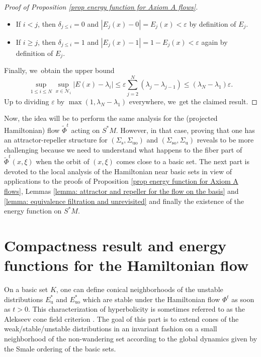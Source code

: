 \documentclass[JEP,XML,SOM,Unicode,NoEqCountersInSection,NoFloatCountersInSection,published]{cedram}
\newcommand{\rs}{\mathrm{s}}
\newcommand{\rso}{\mathrm{so}}
\newcommand{\ru}{\mathrm{u}}
\newcommand{\ruo}{\mathrm{uo}}
\theoremstyle{definition}
\theoremstyle{plain}
\newcommand{\Ncal}{\mathcal{N}}
\begin{document}
\begin{proof}[Proof of Proposition \ref{prop energy function for Axiom A flows}]
\begin{itemize}
\item If $i < j$, then $\delta_{j \leq i} = 0$ and $|E_j (x) - 0| = E_j (x) < \varepsilon$ by definition of $E_j$.
\item If $i \geq j$, then $\delta_{j \leq i} = 1$ and $|E_j (x) - 1| = 1 - E_j (x) < \varepsilon$ again by definition of $E_j$.
\end{itemize}
Finally, we~obtain the upper bound
\[
\sup_{1 \leq i \leq N} \sup_{x \in \Ncal_i} |E (x) - \lambda_i| \leq \varepsilon \sum_{j = 2}^N (\lambda_j - \lambda_{j-1}) \leq (\lambda_N - \lambda_1) \varepsilon.
\]
Up to dividing $\varepsilon$ by $\max (1, \lambda_N- \lambda_1)$ everywhere, we~get the claimed result.
\end{proof}

Now, the idea will be to perform the same analysis for the (projected Hamiltonian) flow $\widetilde{\Phi}^t$ acting on $S^* M$. However, in that case, proving that one has an attractor-repeller structure for $(\Sigma_{\rs}, \Sigma_{\ruo})$ and $(\Sigma_{\rso}, \Sigma_{\ru})$ reveals to be more challenging because we need to understand what happens to the fiber part of $\widetilde{\Phi}^t (x,\xi)$ when the orbit of $(x,\xi)$ comes close to a basic set. The next part is devoted to the local analysis of the Hamiltonian near basic sets in view of applications to the proofs of Proposition \ref{prop energy function for Axiom A flows}, Lemmas \ref{lemma: attractor and repeller for the flow on the basis} and \ref{lemma: equivalence filtration and unrevisited} and finally the existence of the energy function on $S^*M$.

\section{Compactness result and energy functions for the Hamiltonian flow}\label{section: Compactness result and energy functions for the Hamiltonian flow}

On a basic set $K$, one can define conical neighborhoods of the unstable distributions $E_\ru^*$ and $E_{\ruo}^*$ which are stable under the Hamiltonian flow $\Phi^t$ as soon as $t > 0$. This characterization of hyperbolicity is sometimes referred to as the Alekseev cone field criterion \cite[Prop.\,5.1.7]{FH}. The goal of this part is to extend cones of the weak/stable/unstable distributions in an invariant fashion on a small neighborhood of the non-wandering set according to the global dynamics given by the Smale ordering of the basic sets.
\end{document}
